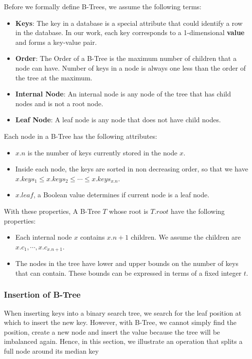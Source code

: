 Before we formally define B-Trees, we assume the following terms:

\begin{itemize}
\item
  \textbf{Keys}: The key in a database is a special attribute that could identify a row in the database. In our work, each key corresponds to a 1-dimensional
  \textbf{value} and forms a key-value pair.
\item
  \textbf{Order}: The Order of a B-Tree is the maximum number of children that a node can have. Number of keys in a node is always one less than the order of the tree at the maximum.
\item
  \textbf{Internal Node}: An internal node is any node of the tree that has child nodes and is not a root node.
\item
  \textbf{Leaf Node}: A leaf node is any node that does not have child nodes.
\end{itemize}

Each node in a B-Tree has the following attributes:

\begin{itemize}
\item
  $x.n$ is the number of keys currently stored in the node $x$.
\item
  Inside each node, the keys are sorted in non decreasing order, so that
  we have $x.keys_1\leq x.keys_2\leq\cdots\leq x.keys_{x.n}$.
\item
  $x.leaf$, a Boolean value determines if current node is a leaf node.
\end{itemize}

With these properties, A B-Tree $T$ whose root is $T.root$ have the
following properties:

\begin{itemize}
\item
  Each internal node $x$ contains $x.n+1$ children. We assume the
  children are $x.c_1,\cdots,x.c_{x.n+1}$.
\item
  The nodes in the tree have lower and upper bounds on the number of
  keys that can contain. These bounds can be expressed in terms of a
  fixed integer $t$.
\end{itemize}

\subsubsection{Insertion of B-Tree}

When inserting keys into a binary search tree, we search for the leaf
position at which to insert the new key. However, with B-Tree, we cannot
simply find the position, create a new node and insert the value because
the tree will be imbalanced again. Hence, in this section, we illustrate
an operation that splits a full node around its median key

